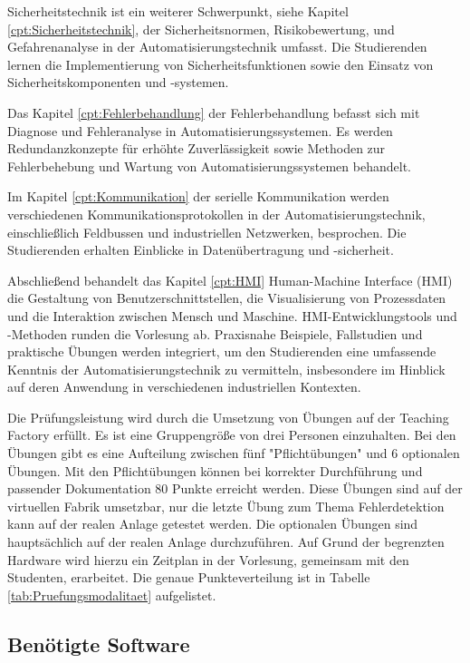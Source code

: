 Sicherheitstechnik ist ein weiterer Schwerpunkt, siehe Kapitel \ref{cpt:Sicherheitstechnik}, der Sicherheitsnormen, Risikobewertung, und Gefahrenanalyse in der Automatisierungstechnik umfasst. Die Studierenden lernen die Implementierung von Sicherheitsfunktionen sowie den Einsatz von Sicherheitskomponenten und -systemen.

Das Kapitel \ref{cpt:Fehlerbehandlung} der Fehlerbehandlung befasst sich mit Diagnose und Fehleranalyse in Automatisierungssystemen. Es werden Redundanzkonzepte für erhöhte Zuverlässigkeit sowie Methoden zur Fehlerbehebung und Wartung von Automatisierungssystemen behandelt.

Im Kapitel \ref{cpt:Kommunikation} der serielle Kommunikation werden verschiedenen Kommunikationsprotokollen in der Automatisierungstechnik, einschließlich Feldbussen und industriellen Netzwerken, besprochen. Die Studierenden erhalten Einblicke in Datenübertragung und -sicherheit.

Abschließend behandelt das Kapitel \ref{cpt:HMI} Human-Machine Interface (HMI) die Gestaltung von Benutzerschnittstellen, die Visualisierung von Prozessdaten und die Interaktion zwischen Mensch und Maschine. HMI-Entwicklungstools und -Methoden runden die Vorlesung ab. Praxisnahe Beispiele, Fallstudien und praktische Übungen werden integriert, um den Studierenden eine umfassende Kenntnis der Automatisierungstechnik zu vermitteln, insbesondere im Hinblick auf deren Anwendung in verschiedenen industriellen Kontexten.




Die Prüfungsleistung wird durch die Umsetzung von Übungen auf der Teaching Factory erfüllt. Es ist eine Gruppengröße von drei Personen einzuhalten. Bei den Übungen gibt es eine Aufteilung zwischen fünf "Pflichtübungen" und 6 optionalen Übungen. Mit den Pflichtübungen können bei korrekter Durchführung und passender Dokumentation 80 Punkte erreicht werden. Diese Übungen sind auf der virtuellen Fabrik umsetzbar, nur die letzte Übung zum Thema Fehlerdetektion kann auf der realen Anlage getestet werden. Die optionalen Übungen sind hauptsächlich auf der realen Anlage durchzuführen. Auf Grund der begrenzten Hardware wird hierzu ein Zeitplan in der Vorlesung, gemeinsam mit den Studenten, erarbeitet. Die genaue Punkteverteilung ist in Tabelle \ref{tab:Pruefungsmodalitaet} aufgelistet. 




\subsection{Benötigte Software} \label{sec:Software}

